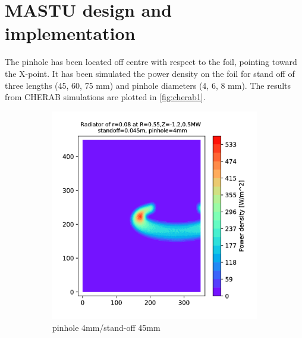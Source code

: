\section{MASTU design and implementation}
The pinhole has been located off centre with respect to the foil, pointing toward the X-point. It has been simulated the power density on the foil for stand off of three lengths (45, 60, 75 mm) and pinhole diameters (4, 6, 8 mm). The results from CHERAB simulations are plotted in \autoref{fig:cherab1}.


\begin{figure}
     \centering
     \begin{subfigure}{0.3\textwidth}
         \centering
         \includegraphics[trim={70 0 125 0},clip,width=\textwidth]{Chapters/appendix1/figs/4_45.png}
         \caption{pinhole 4mm/stand-off 45mm}
         \label{fig:4_45}
     \end{subfigure}
     \hfill
     \begin{subfigure}{0.3\textwidth}
         \centering

\end{subfigure}
\end{figure}
